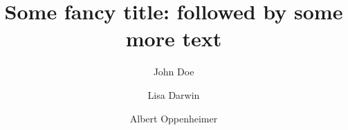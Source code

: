 \documentclass[final]{beamer}
\title{Some fancy title: followed by some more text}
\author{John Doe \inst{1} \and Lisa Darwin \inst{2} \and Albert Oppenheimer \inst{2}}
\institute[shortinst]{\inst{1} Some Institute \samelineand \inst{2} Another Institute}
\newlength{\sepwidth}
\newcommand{\separatorcolumn}{\begin{column}{\sepwidth}\end{column}}
\begin{document}
\begin{frame}[t]
\begin{columns}[t]

\separatorcolumn


\separatorcolumn


\separatorcolumn


\separatorcolumn

\end{columns}
\end{frame}
\end{document}
